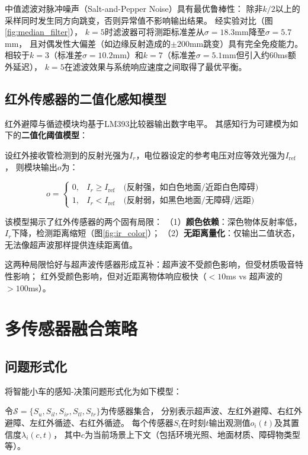 \documentclass[12pt,a4paper]{ctexart}
\begin{document}
中值滤波对脉冲噪声（Salt-and-Pepper Noise）具有最优鲁棒性：
除非$k/2$以上的采样同时发生同方向跳变，否则异常值不影响输出结果。
经实验对比（图\ref{fig:median_filter}），
$k=5$时滤波器可将测距标准差从$\sigma=18.3$mm降至$\sigma=5.7$mm，
且对偶发性大偏差（如边缘反射造成的$\pm200$mm跳变）具有完全免疫能力。
相较于$k=3$（标准差$\sigma=10.2$mm）和$k=7$（标准差$\sigma=5.1$mm但引入约60ms额外延迟），
$k=5$在滤波效果与系统响应速度之间取得了最优平衡。

\subsection{红外传感器的二值化感知模型}

红外避障与循迹模块均基于LM393比较器输出数字电平。
其感知行为可建模为如下的\textbf{二值化阈值模型}：

设红外接收管检测到的反射光强为$I_r$，电位器设定的参考电压对应等效光强为$I_{\text{ref}}$，
则模块输出$o$为：

\begin{equation}
o = \begin{cases}
0, & I_r \geq I_{\text{ref}} \quad \text{(反射强，如白色地面/近距白色障碍)} \\
1, & I_r < I_{\text{ref}} \quad \text{(反射弱，如黑色地面/无障碍/远距)}
\end{cases}
\label{eq:ir_model}
\end{equation}

该模型揭示了红外传感器的两个固有局限：
（1）\textbf{颜色依赖}：深色物体反射率低，$I_r$下降，检测距离缩短（图\ref{fig:ir_color}）；
（2）\textbf{无距离量化}：仅输出二值状态，无法像超声波那样提供连续距离值。

这两种局限恰好与超声波传感器形成互补：超声波不受颜色影响，但受材质吸音特性影响；
红外受颜色影响，但对近距离物体响应极快（$<10$ms vs 超声波的$>100$ms）。

\section{多传感器融合策略}

\subsection{问题形式化}

将智能小车的感知-决策问题形式化为如下模型：

令$\mathcal{S} = \{S_u, S_{il}, S_{ir}, S_{tl}, S_{tr}\}$为传感器集合，
分别表示超声波、左红外避障、右红外避障、左红外循迹、右红外循迹。
每个传感器$S_i$在时刻$t$输出观测值$o_i(t)$及其置信度$\lambda_i(c, t)$，
其中$c$为当前场景上下文（包括环境光照、地面材质、障碍物类型等）。
\end{document}
